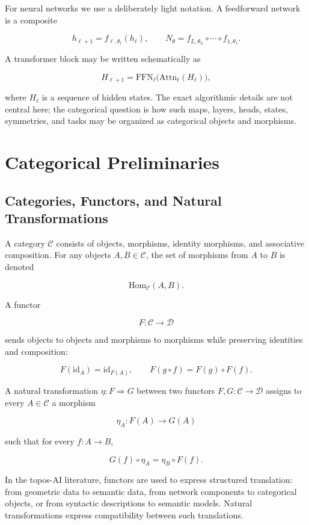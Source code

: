 \documentclass[11pt]{article}
\begin{document}
For neural networks we use a deliberately light notation. A feedforward network is a composite


\[
h_{\ell+1}=f_{\ell,\theta_\ell}(h_\ell),
\qquad
N_\theta=f_{L,\theta_L}\circ\cdots\circ f_{1,\theta_1}.
\]

A transformer block may be written schematically as


\[
H_{\ell+1}
=\mathrm{FFN}_\ell\bigl(\mathrm{Attn}_\ell(H_\ell)\bigr),
\]

where \(H_\ell\) is a sequence of hidden states. The exact algorithmic details are not central here; the categorical question is how such maps, layers, heads, states, symmetries, and tasks may be organized as categorical objects and morphisms.


\section{Categorical Preliminaries}

\subsection{Categories, Functors, and Natural Transformations}

A category \(\mathcal{C}\) consists of objects, morphisms, identity morphisms, and associative composition. For any objects \(A,B\in\mathcal{C}\), the set of morphisms from \(A\) to \(B\) is denoted


\[
\mathrm{Hom}_{\mathcal{C}}(A,B).
\]

A functor


\[
F:\mathcal{C}\to\mathcal{D}
\]

sends objects to objects and morphisms to morphisms while preserving identities and composition:


\[
F(\mathrm{id}_A)=\mathrm{id}_{F(A)},\qquad
F(g\circ f)=F(g)\circ F(f).
\]

A natural transformation \(\eta:F\Rightarrow G\) between two functors \(F,G:\mathcal{C}\to\mathcal{D}\) assigns to every \(A\in\mathcal{C}\) a morphism


\[
\eta_A:F(A)\to G(A)
\]

such that for every \(f:A\to B\),


\[
G(f)\circ \eta_A=\eta_B\circ F(f).
\]

In the topos-AI literature, functors are used to express structured translation: from geometric data to semantic data, from network components to categorical objects, or from syntactic descriptions to semantic models. Natural transformations express compatibility between such translations.
\end{document}
